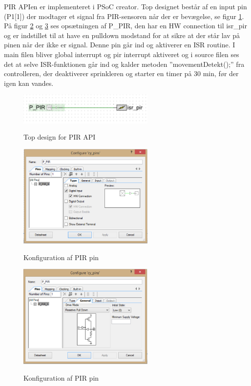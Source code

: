 PIR APIen er implementeret i PSoC creator. Top designet består af en input pin (P1[1]) der modtager et signal fra PIR-sensoren når der er bevægelse, se figur \ref{lab:pir_topdesign}. På figur \ref{lab:pir_topdesign_1} og \ref{lab:pir_topdesign_2} ses opsætningen af P\_PIR, den har en HW connection til isr\_pir og er indstillet til at have en pulldown modstand for at sikre at der står lav på pinen når der ikke er signal. Denne pin går ind og aktiverer en ISR routine. I main filen bliver global interrupt og pir interrupt aktiveret og i source filen ses det at selve ISR-funktionen går ind og kalder metoden ''movementDetekt();'' fra controlleren, der deaktiverer sprinkleren og starter en timer på 30 min, før der igen kan vandes.


\begin{figure}[htb]
\centering
{\includegraphics[width=0.60\textwidth]{filer/pics/pir_api_topdesign}}
\caption{Top design for PIR API}
\label{lab:pir_topdesign}
\end{figure}

\begin{figure}[htb]
\centering
{\includegraphics[width=0.60\textwidth]{filer/pics/pir_api_topdesign_1}}
\caption{Konfiguration af PIR pin}
\label{lab:pir_topdesign_1}
\end{figure}

\begin{figure}[H]
\centering
{\includegraphics[width=0.60\textwidth]{filer/pics/pir_api_topdesign_2}}
\caption{Konfiguration af PIR pin}
\label{lab:pir_topdesign_2}
\end{figure}

